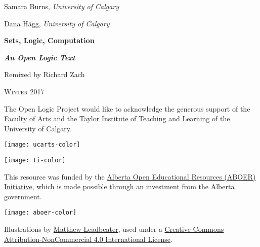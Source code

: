Samara Burns, \emph{University of Calgary}

Dana H\"agg, \emph{University of Calgary}

\newpage


\vspace*{100pt}

\begin{raggedleft}

{\fontsize{24pt}{24pt}\selectfont\bfseries\sffamily%
  Sets, Logic, Computation}

\smallskip

{\fontsize{18pt}{18pt}\selectfont\bfseries\itshape An Open Logic Text}

\vspace{100pt}

\fontsize{14pt}{14pt}\selectfont Remixed by Richard Zach

\vfill

\textsc{Winter 2017} %

\end{raggedleft}


\newpage


\noindent
The Open Logic Project would like to acknowledge the generous support
of the \href{http://arts.ucalgary.ca/}{Faculty of Arts} and
the \href{http://www.ucalgary.ca/taylorinstitute/}{Taylor Institute of
Teaching and Learning} of the University of Calgary.

\bigskip

\noindent\texttt{[image: ucarts-color]}

\medskip

\noindent\texttt{[image: ti-color]}

\bigskip\noindent
This resource was funded by the \href{http://albertaoer.com}{Alberta
Open Educational Resources (ABOER) Initiative}, which is made possible
through an investment from the Alberta government.

\noindent\texttt{[image: aboer-color]}

\vfill


\noindent Illustrations by \href{http://mattleadbeater.com}{Matthew
  Leadbeater}, used under a
\href{http://creativecommons.org/licenses/by-nc/4.0/}{Creative Commons
  Attribution-NonCommercial 4.0 International License}.

\vfill

